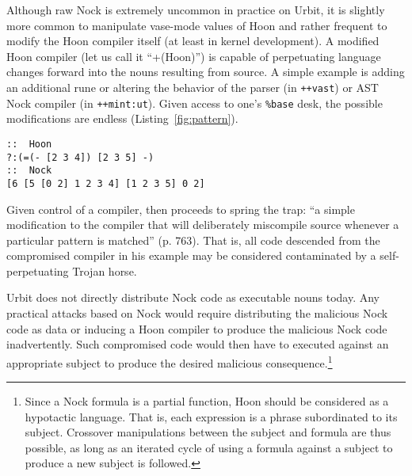 \documentclass[twoside]{article}
\begin{document}

Although raw Nock is extremely uncommon in practice on Urbit, it is slightly more common to manipulate vase-mode values of Hoon and rather frequent to modify the Hoon compiler itself (at least in kernel development).  A modified Hoon compiler (let us call it ``+(Hoon)'') is capable of perpetuating language changes forward into the nouns resulting from source.  A simple example is adding an additional rune or altering the behavior of the parser (in \lstinline[style=inlinecode]{++vast}) or AST Nock compiler (in \lstinline[style=inlinecode]{++mint:ut}).  Given access to one's \lstinline[style=inlinecode]{%base} desk, the possible modifications are endless (Listing~\ref{fig:pattern}).

\begin{lstlisting}[style=listingcode,
                   label=fig:pattern,
                   caption={A simple example of pattern-detecting adaptive code in Hoon and Nock.}]
::  Hoon
?:(=(- [2 3 4]) [2 3 5] -)
::  Nock
[6 [5 [0 2] 1 2 3 4] [1 2 3 5] 0 2]
\end{lstlisting}

Given control of a compiler, \citeauthor{Thompson1984} then proceeds to spring the trap:  ``a simple modification to the compiler that will deliberately miscompile source whenever a particular pattern is matched'' (p. 763).  That is, all code descended from the compromised compiler in his example may be considered contaminated by a self-perpetuating Trojan horse.

Urbit does not directly distribute Nock code as executable nouns today.  Any practical attacks based on Nock would require distributing the malicious Nock code as data or inducing a Hoon compiler to produce the malicious Nock code inadvertently.  Such compromised code would then have to executed against an appropriate subject to produce the desired malicious consequence.\footnote{Since a Nock formula is a partial function, Hoon should be considered as a hypotactic language.  That is, each expression is a phrase subordinated to its subject.  Crossover manipulations between the subject and formula are thus possible, as long as an iterated cycle of using a formula against a subject to produce a new subject is followed.}
\end{document}
